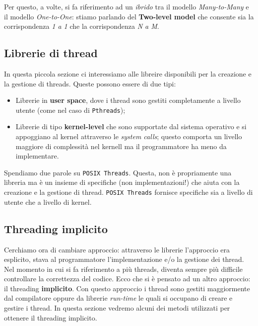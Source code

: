 Per questo, a volte, si fa riferimento ad un \textit{ibrido} tra il modello \textit{Many-to-Many} e il modello \textit{One-to-One}: stiamo parlando del \textbf{Two-level model} che consente sia la corrispondenza \textit{1 a 1} che la corrispondenza \textit{N a M}.

% 
\subsection{Librerie di thread}
In questa piccola sezione ci interessiamo alle libreire disponibili per la creazione e la gestione di threads. Queste possono essere di due tipi:
\begin{itemize}
\setlength{\itemsep}{-.15 em}
    \item Librerie in \textbf{user space}, dove i thread sono gestiti completamente a livello utente (come nel caso di \texttt{Pthreads});
    \item Librerie di tipo \textbf{kernel-level} che sono supportate dal sistema operativo e si appoggiano al kernel attraverso le \textit{system calls}; questo comporta un livello maggiore di complessità nel kernell ma il programmatore ha meno da implementare.
\end{itemize}

\noindent Spendiamo due parole su \texttt{POSIX Threads}. Questa, non è propriamente una libreria ma è un insieme di specifiche (non implementazioni!) che aiuta con la creazione e la gestione di thread. \texttt{POSIX Threads} fornisce specifiche sia a livello di utente che a livello di kernel.

% 
\subsection{Threading implicito}
Cerchiamo ora di cambiare approccio: attraverso le librerie l'approccio era esplicito, stava al programmatore l'implementazione e/o la gestione dei thread. Nel momento in cui si fa riferimento a più threads, diventa sempre più difficile controllare la correttezza del codice. Ecco che si è pensato ad un altro approccio: il threading \textbf{implicito}. Con questo approccio i thread sono gestiti maggiormente dal compilatore oppure da librerie \textit{run-time} le quali si occupano di creare e gestire i thread. In questa sezione vedremo alcuni dei metodi utilizzati per ottenere il threading implicito. 
% 
